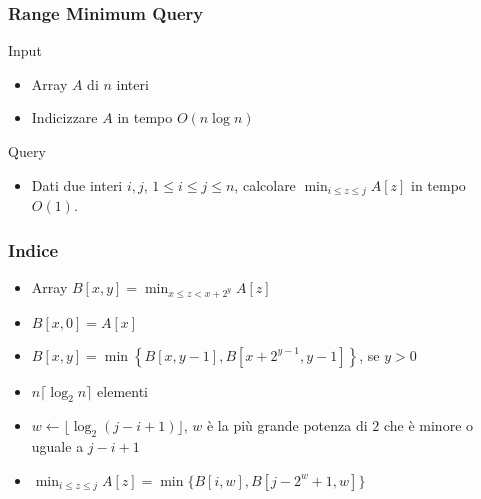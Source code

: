 \begin{frame}
  \titlepage
\end{frame}


\begin{frame}[fragile]
\frametitle{Range Minimum Query}
\begin{block}{Input}
\begin{itemize}
\item
Array $A$ di $n$ interi
\item
Indicizzare $A$ in tempo $O(n \log n)$
\end{itemize}
\end{block}
\begin{block}{Query}
\begin{itemize}
\item
Dati due interi $i, j$, $1\le i\le j\le n$, calcolare $\min_{i\le z\le j}A[z]$ in tempo $O(1)$.
\end{itemize}
\end{block}
\end{frame}

\begin{frame}[fragile]
\frametitle{Indice}
\begin{itemize}
\item
Array $B[x,y] = \min_{x\le z < x+2^{y}}A[z] $
\item
$B[x,0] = A[x] $
\item
$B[x,y] = \min \left\{ B[x,y-1], B[x + 2^{y-1},y-1] \right\}$, se $y>0$
\item
$n \lceil  \log_{2} n \rceil$ elementi
\item
$w\gets \lfloor   \log_{2} (j-i+1) \rfloor$, $w$ è la più grande potenza di $2$ che è minore o uguale
a $j-i+1$
\item
$\min_{i\le z\le j}A[z] = \min \{ B[i, w], B[j - 2^{w} + 1, w]\}$
\end{itemize}
\end{frame}


